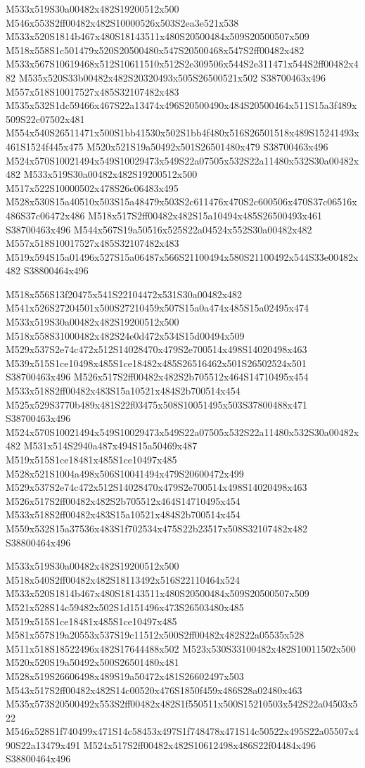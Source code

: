 \documentclass{article}
\begin{document}
\begin{multicols}{2}
M533x519S30a00482x482S19200512x500 M546x553S2ff00482x482S10000526x503S2ea3e521x538 M533x520S1814b467x480S18143511x480S20500484x509S20500507x509 M518x558S1c501479x520S20500480x547S20500468x547S2ff00482x482 M533x567S10619468x512S10611510x512S2e309506x544S2e311471x544S2ff00482x482 M535x520S33b00482x482S20320493x505S26500521x502 S38700463x496 M557x518S10017527x485S32107482x483 M535x532S1dc59466x467S22a13474x496S20500490x484S20500464x511S15a3f489x509S22c07502x481 M554x540S26511471x500S1bb41530x502S1bb4f480x516S26501518x489S15241493x461S1524f445x475 M520x521S19a50492x501S26501480x479 S38700463x496 M524x570S10021494x549S10029473x549S22a07505x532S22a11480x532S30a00482x482 M533x519S30a00482x482S19200512x500 M517x522S10000502x478S26c06483x495 M528x530S15a40510x503S15a48479x503S2c611476x470S2c600506x470S37c06516x486S37c06472x486 M518x517S2ff00482x482S15a10494x485S26500493x461 S38700463x496 M544x567S19a50516x525S22a04524x552S30a00482x482 M557x518S10017527x485S32107482x483 M519x594S15a01496x527S15a06487x566S21100494x580S21100492x544S33e00482x482 S38800464x496

M518x556S13f20475x541S22104472x531S30a00482x482 M541x526S27204501x500S27210459x507S15a0a474x485S15a02495x474 M533x519S30a00482x482S19200512x500 M518x558S31000482x482S24e0d472x534S15d00494x509 M529x537S2e74c472x512S14028470x479S2e700514x498S14020498x463 M539x515S1ce10498x485S1ce18482x485S26516462x501S26502524x501 S38700463x496 M526x517S2ff00482x482S2b705512x464S14710495x454 M533x518S2ff00482x483S15a10521x484S2b700514x454 M525x529S3770b489x481S22f03475x508S10051495x503S37800488x471 S38700463x496 M524x570S10021494x549S10029473x549S22a07505x532S22a11480x532S30a00482x482 M531x514S2940a487x494S15a50469x487 M519x515S1ce18481x485S1ce10497x485 M528x521S1004a498x506S10041494x479S20600472x499 M529x537S2e74c472x512S14028470x479S2e700514x498S14020498x463 M526x517S2ff00482x482S2b705512x464S14710495x454 M533x518S2ff00482x483S15a10521x484S2b700514x454 M559x532S15a37536x483S1f702534x475S22b23517x508S32107482x482 S38800464x496

M533x519S30a00482x482S19200512x500 M518x540S2ff00482x482S18113492x516S22110464x524 M533x520S1814b467x480S18143511x480S20500484x509S20500507x509 M521x528S14c59482x502S1d151496x473S26503480x485 M519x515S1ce18481x485S1ce10497x485 M581x557S19a20553x537S19c11512x500S2ff00482x482S22a05535x528 M511x518S18522496x482S17644488x502 M523x530S33100482x482S10011502x500 M520x520S19a50492x500S26501480x481 M528x519S26606498x489S19a50472x481S26602497x503 M543x517S2ff00482x482S14c00520x476S1850f459x486S28a02480x463 M535x573S20500492x553S2ff00482x482S1f550511x500S15210503x542S22a04503x522 M546x528S1f740499x471S14c58453x497S1f748478x471S14c50522x495S22a05507x490S22a13479x491 M524x517S2ff00482x482S10612498x486S22f04484x496 S38800464x496


\end{multicols}
\end{document}
